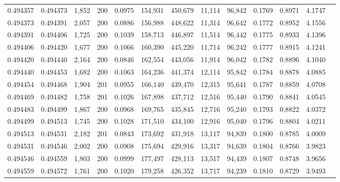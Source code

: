 \begin{tabular}{rrrrrrrrrrrrr}
0.494357 & 0.494373 & 1,852 & 200 &                                     0.0975 & 154,931 & 450,679 &  11,114 &  96,842 & 0.1769 & 0.8971 & 4.1747 \\
0.494373 & 0.494391 & 2,057 & 200 &                                     0.0886 & 156,988 & 448,622 &  11,314 &  96,642 & 0.1772 & 0.8952 & 4.1556 \\
0.494391 & 0.494406 & 1,725 & 200 &                                     0.1039 & 158,713 & 446,897 &  11,514 &  96,442 & 0.1775 & 0.8933 & 4.1396 \\
0.494406 & 0.494420 & 1,677 & 200 &                                     0.1066 & 160,390 & 445,220 &  11,714 &  96,242 & 0.1777 & 0.8915 & 4.1241 \\
0.494420 & 0.494440 & 2,164 & 200 &                                     0.0846 & 162,554 & 443,056 &  11,914 &  96,042 & 0.1782 & 0.8896 & 4.1040 \\
0.494440 & 0.494453 & 1,682 & 200 &                                     0.1063 & 164,236 & 441,374 &  12,114 &  95,842 & 0.1784 & 0.8878 & 4.0885 \\
0.494454 & 0.494468 & 1,904 & 201 &                                     0.0955 & 166,140 & 439,470 &  12,315 &  95,641 & 0.1787 & 0.8859 & 4.0708 \\
0.494469 & 0.494482 & 1,758 & 201 &                                     0.1026 & 167,898 & 437,712 &  12,516 &  95,440 & 0.1790 & 0.8841 & 4.0545 \\
0.494483 & 0.494499 & 1,867 & 200 &                                     0.0968 & 169,765 & 435,845 &  12,716 &  95,240 & 0.1793 & 0.8822 & 4.0372 \\
0.494499 & 0.494513 & 1,745 & 200 &                                     0.1028 & 171,510 & 434,100 &  12,916 &  95,040 & 0.1796 & 0.8804 & 4.0211 \\
0.494513 & 0.494531 & 2,182 & 201 &                                     0.0843 & 173,692 & 431,918 &  13,117 &  94,839 & 0.1800 & 0.8785 & 4.0009 \\
0.494531 & 0.494546 & 2,002 & 200 &                                     0.0908 & 175,694 & 429,916 &  13,317 &  94,639 & 0.1804 & 0.8766 & 3.9823 \\
0.494546 & 0.494559 & 1,803 & 200 &                                     0.0999 & 177,497 & 428,113 &  13,517 &  94,439 & 0.1807 & 0.8748 & 3.9656 \\
0.494559 & 0.494572 & 1,761 & 200 &                                     0.1020 & 179,258 & 426,352 &  13,717 &  94,239 & 0.1810 & 0.8729 & 3.9493 \\

\end{tabular}

